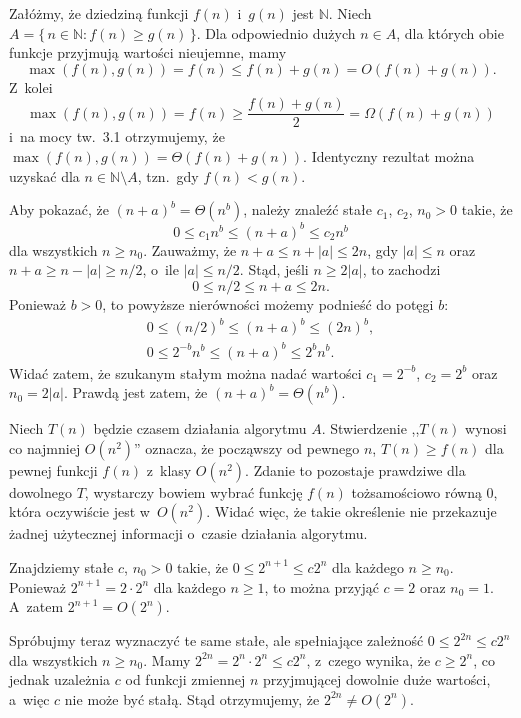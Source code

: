 
\exercise %
Załóżmy, że dziedziną funkcji $f(n)$ i~$g(n)$ jest $\mathbb{N}$.
Niech $A=\{\,n\in\mathbb{N}:f(n)\ge g(n)\,\}$.
Dla odpowiednio dużych $n\in A$, dla których obie funkcje przyjmują wartości nieujemne, mamy
\[
    \max(f(n),g(n)) = f(n) \le f(n)+g(n) = O(f(n)+g(n)).
\]
Z~kolei
\[
    \max(f(n),g(n)) = f(n) \ge \frac{f(n)+g(n)}{2} = \Omega(f(n)+g(n))
\]
i~na mocy tw.\ 3.1 otrzymujemy, że $\max(f(n),g(n))=\Theta(f(n)+g(n))$.
Identyczny rezultat można uzyskać dla $n\in\mathbb{N}\setminus A$, tzn.\ gdy $f(n)<g(n)$.

\exercise %
Aby pokazać, że $(n+a)^b=\Theta(n^b)$, należy znaleźć stałe $c_1$, $c_2$, $n_0>0$ takie, że
\[
	0 \le c_1n^b \le (n+a)^b \le c_2n^b
\]
dla wszystkich $n\ge n_0$.
Zauważmy, że $n+a\le n+|a|\le2n$, gdy $|a|\le n$ oraz $n+a\ge n-|a|\ge n/2$, o~ile $|a|\le n/2$.
Stąd, jeśli $n\ge 2|a|$, to zachodzi
\[
	0 \le n/2 \le n+a \le 2n.
\]
Ponieważ $b>0$, to powyższe nierówności możemy podnieść do potęgi $b$:
\begin{gather*}
	0 \le (n/2)^b \le (n+a)^b \le (2n)^b, \\
	0 \le 2^{-b}n^b \le (n+a)^b \le 2^bn^b.
\end{gather*}
Widać zatem, że szukanym stałym można nadać wartości $c_1=2^{-b}$, $c_2=2^b$ oraz $n_0=2|a|$.
Prawdą jest zatem, że $(n+a)^b=\Theta(n^b)$.

\exercise %
Niech $T(n)$ będzie czasem działania algorytmu $A$.
Stwierdzenie ,,$T(n)$ wynosi co najmniej $O(n^2)$'' oznacza, że począwszy od pewnego $n$, $T(n)\ge f(n)$ dla pewnej funkcji $f(n)$ z~klasy $O(n^2)$.
Zdanie to pozostaje prawdziwe dla dowolnego $T$, wystarczy bowiem wybrać funkcję $f(n)$ tożsamościowo równą 0, która oczywiście jest w~$O(n^2)$.
Widać więc, że takie określenie nie przekazuje żadnej użytecznej informacji o~czasie działania algorytmu.

\exercise %
Znajdziemy stałe $c$, $n_0>0$ takie, że $0\le2^{n+1}\le c2^n$ dla każdego $n\ge n_0$.
Ponieważ $2^{n+1}=2\cdot2^n$ dla każdego $n\ge1$, to można przyjąć $c=2$ oraz $n_0=1$.
A~zatem $2^{n+1}=O(2^n)$.

Spróbujmy teraz wyznaczyć te same stałe, ale spełniające zależność $0\le2^{2n}\le c2^n$ dla wszystkich $n\ge n_0$.
Mamy $2^{2n}=2^n\cdot2^n\le c2^n$, z~czego wynika, że $c\ge2^n$, co jednak uzależnia $c$ od funkcji zmiennej $n$ przyjmującej dowolnie duże wartości, a~więc $c$ nie może być stałą.
Stąd otrzymujemy, że $2^{2n}\ne O(2^n)$.

